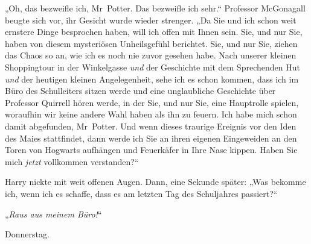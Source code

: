 „Oh, das bezweifle ich, Mr~Potter. Das bezweifle ich sehr.“ Professor McGonagall beugte sich vor, ihr Gesicht wurde wieder strenger. „Da Sie und ich schon weit ernstere Dinge besprochen haben, will ich offen mit Ihnen sein. Sie, und nur Sie, haben von diesem mysteriösen Unheilsgefühl berichtet. Sie, und nur Sie, ziehen das Chaos so an, wie ich es noch nie zuvor gesehen habe. Nach unserer kleinen Shoppingtour in der Winkelgasse \emph{und} der Geschichte mit dem Sprechenden Hut \emph{und} der heutigen kleinen Angelegenheit, sehe ich es schon kommen, dass ich im Büro des Schulleiters sitzen werde und eine unglaubliche Geschichte über Professor Quirrell hören werde, in der Sie, und nur Sie, eine Hauptrolle spielen, woraufhin wir keine andere Wahl haben als ihn zu feuern. Ich habe mich schon damit abgefunden, Mr~Potter. Und wenn dieses traurige Ereignis vor den Iden des Maies stattfindet, dann werde ich Sie an ihren eigenen Eingeweiden an den Toren von Hogwarts aufhängen und Feuerkäfer in Ihre Nase kippen. Haben Sie mich \emph{jetzt} vollkommen verstanden?“

Harry nickte mit weit offenen Augen. Dann, eine Sekunde später: „Was bekomme ich, wenn ich es schaffe, dass es am letzten Tag des Schuljahres passiert?“

„\emph{Raus aus meinem Büro!}“

\later

Donnerstag.


